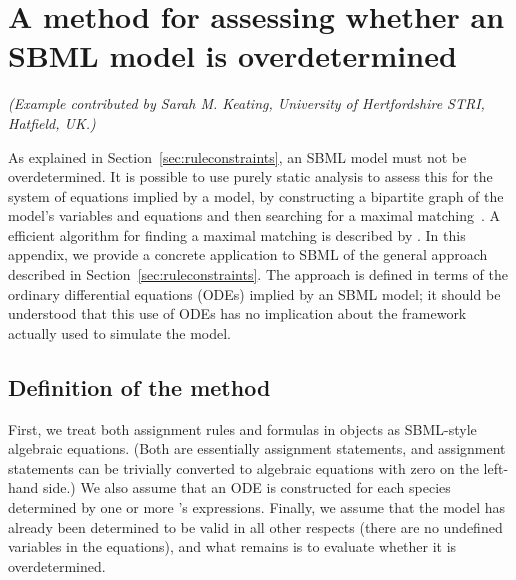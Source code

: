 
\section{A method for assessing whether an SBML model is overdetermined}
\label{apdx:assessing-overdetermined}

\emph{(Example contributed by Sarah M. Keating, University of
  Hertfordshire STRI, Hatfield, UK.)}

As explained in Section~\ref{sec:ruleconstraints}, an SBML model
must not be overdetermined.  It is possible to use purely static
analysis to assess this for the system of equations implied by a
model, by constructing a bipartite graph of the model's variables
and equations and then searching for a maximal
matching~\citep{chartrand_1977}.  A efficient algorithm for finding
a maximal matching is described by \cite{hopcroft:1973}.  In this
appendix, we provide a concrete application to SBML of the general
approach described in Section~\ref{sec:ruleconstraints}.  The
approach is defined in terms of the ordinary differential
equations (ODEs) implied by an SBML model; it should be understood
that this use of ODEs has no implication about the framework
actually used to simulate the model.


\subsection*{Definition of the method}
\label{sec:overdetermined-method}

First, we treat both assignment rules and formulas in \KineticLaw
objects as SBML-style algebraic equations.  (Both are essentially
assignment statements, and assignment statements can be trivially
converted to algebraic equations with zero on the left-hand side.)
We also assume that an ODE is constructed for each species
determined by one or more \Reaction's \KineticLaw {}
expressions.  Finally, we assume that the model has already been
determined to be valid in all other respects (\eg there are no
undefined variables in the equations), and what remains is to
evaluate whether it is overdetermined.


